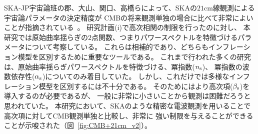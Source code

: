 \begin{enumerate}
SKA-JP宇宙論班の郡、大山、関口、高橋らによって、SKAの$21$cm線観測による宇宙論パラメータの決定精度が
CMBの将来観測単独の場合に比べて非常によいことが指摘されている~\citep{Kohri:2013mxa}。
研究計画(i)で高次相関の制限を行ったのに対し、
本研究では原始曲率揺らぎの$2$点関数、つまりパワースペクトルを特徴づけるパラメータについて考察している。
これらは相補的であり、どちらもインフレーション模型を区別するために重要なツールである。
これまで行われた多くの研究は、原始曲率揺らぎパワースペクトルを特徴づける、冪指数($n_{\rm s}$)、
冪指数の波数依存性($\alpha_{\rm s}$)についてのみ着目していた。
しかし、これだけでは多様なインフレーション模型を区別するには不十分である。
そのためにはより高次項($\beta_{\rm s}$)を導入するのが必要であるが、
一般に非常に小さいことから観測は困難だろうと思われていた。
本研究において、SKAのような精密な電波観測を用いることで高次項に対してCMB観測単独と比較し、非常に
強い制限を与えることができることが示唆された（図~\ref{fig:CMB+21cm_v2}）。


\end{enumerate}
